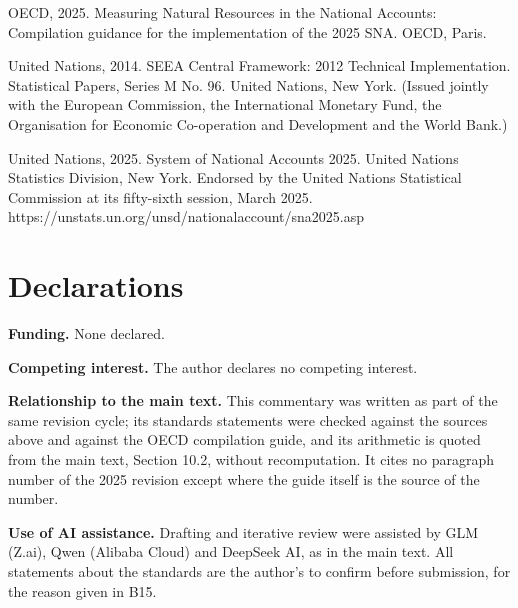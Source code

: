\documentclass[11pt]{article}
\begin{document}
OECD, 2025. Measuring Natural Resources in the National Accounts: Compilation guidance for the implementation of the 2025 SNA. OECD, Paris.

United Nations, 2014. SEEA Central Framework: 2012 Technical Implementation. Statistical Papers, Series M No. 96. United Nations, New York. (Issued jointly with the European Commission, the International Monetary Fund, the Organisation for Economic Co-operation and Development and the World Bank.)

United Nations, 2025. System of National Accounts 2025. United Nations Statistics Division, New York. Endorsed by the United Nations Statistical Commission at its fifty-sixth session, March 2025. https://unstats.un.org/unsd/nationalaccount/sna2025.asp

\vspace{0.8em}

\section*{Declarations}\label{declarations}

\textbf{Funding.} None declared.

\textbf{Competing interest.} The author declares no competing interest.

\textbf{Relationship to the main text.} This commentary was written as part of the same revision cycle; its standards statements were checked against the sources above and against the OECD compilation guide, and its arithmetic is quoted from the main text, Section 10.2, without recomputation. It cites no paragraph number of the 2025 revision except where the guide itself is the source of the number.

\textbf{Use of AI assistance.} Drafting and iterative review were assisted by GLM (Z.ai), Qwen (Alibaba Cloud) and DeepSeek AI, as in the main text. All statements about the standards are the author's to confirm before submission, for the reason given in B15.
\end{document}
